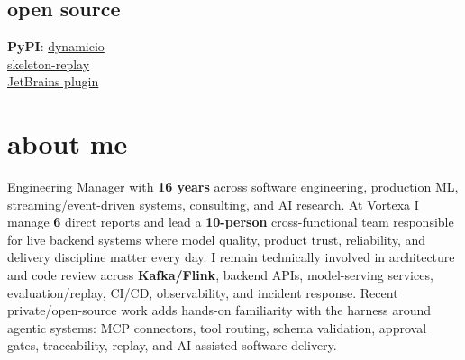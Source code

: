 \documentclass[]{../../../../friggeri-cv}
\begin{document}
\begin{aside}
    \section{open source}
        {\footnotesize \textbf{PyPI}: \href{https://pypi.org/project/dynamicio/}{dynamicio}\\\href{https://pypi.org/project/skeleton-replay/}{skeleton-replay}\\\href{https://plugins.jetbrains.com/plugin/32807-skeleton-replay}{JetBrains plugin}}
\end{aside}

\section{about me}
{\small Engineering Manager with \textbf{16 years} across software engineering, production ML, streaming/event-driven systems, consulting, and AI research. At Vortexa I manage \textbf{6} direct reports and lead a \textbf{10-person} cross-functional team responsible for live backend systems where model quality, product trust, reliability, and delivery discipline matter every day. I remain technically involved in architecture and code review across \textbf{Kafka/Flink}, backend APIs, model-serving services, evaluation/replay, CI/CD, observability, and incident response. Recent private/open-source work adds hands-on familiarity with the harness around agentic systems: MCP connectors, tool routing, schema validation, approval gates, traceability, replay, and AI-assisted software delivery.}
\end{document}
